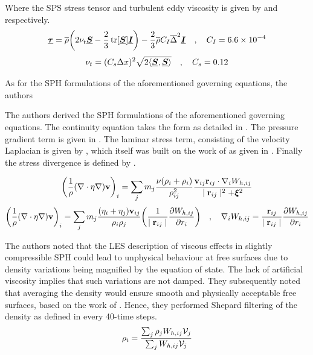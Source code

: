 Where the SPS stress tensor and turbulent eddy viscosity is given by  and  respectively.
\begin{equation}
    \tensor{\tau} = \overline{\rho}\bigg(2\nu_t \tensor{S} - \frac{2}{3}\operatorname{tr}[\tensor{S}]\tensor{I}\bigg) - \frac{2}{3}\overline{\rho}C_I \overline{\Delta}^2 \tensor{I} \quad , \quad C_I = \SciNot{6.6}{-4}
    \label{eq:ROGERS2005-tau}
\end{equation}
\begin{equation}
    \nu_t = (C_s \Delta x)^2 \sqrt{2 \FrobeniusInnerProduct{S}{S}} \quad , \quad C_s = 0.12
    \label{eq:ROGERS2005-turbulent-eddy-visc}
\end{equation}

As for the SPH formulations of the aforementioned governing equations, the authors

The authors derived the SPH formulations of the aforementioned governing equations. The continuity equation takes the form as detailed in . The pressure gradient term is given in . The laminar stress term, consisting of the velocity Laplacian is given by , which itself was built on the work of \cite{morris1997modeling} as given in . Finally the stress divergence is defined by .

\begin{equation}
    \bigg( \frac{1}{\rho} (\nabla \cdot \eta \nabla) \vect{v} \bigg)_i = \sum_j m_j \frac{\nu (\rho_i + \rho_i)}{\rho_{ij}^2} \frac{\VIJ \RIJ \cdot \DWIJ}{\RtwoIJ + \MachineEpsilon^2}
    \label{eq:ROGERS2005-vel-laplacian-sph}
\end{equation}
\begin{equation}
    \bigg( \frac{1}{\rho} (\nabla \cdot \eta \nabla) \vect{v} \bigg)_i = \sum_j m_j \frac{(\eta_i + \eta_j) \VIJ}{\rho_i \rho_j} \bigg( \frac{1}{\RtwoIJ[]} \PartialDerivative[r_i]{\WIJ} \bigg) \quad , \quad \DWIJ = \frac{\RIJ}{\RtwoIJ[]} \PartialDerivative[r_i]{\WIJ}
    \label{eq:morris1997modeling-vel-laplacian-sph}
\end{equation}

The authors noted that the LES description of viscous effects in slightly compressible SPH could lead to unphysical behaviour at free surfaces due to density variations being magnified by the equation of state. The lack of artificial viscosity implies that such variations are not damped. They subsequently noted that averaging the density would ensure smooth and physically acceptable free surfaces, based on the work of \cite{panizzo2004physical}. Hence, they performed Shepard filtering of the density as defined in  every 40-time steps.
\begin{equation}
    \rho_i = \frac{\sum_j \rho_j \WIJ \Vol_j}{\sum_j \WIJ \Vol_j}
    \label{eq:ROGERS2005-rho-shepard-filter}
\end{equation}

